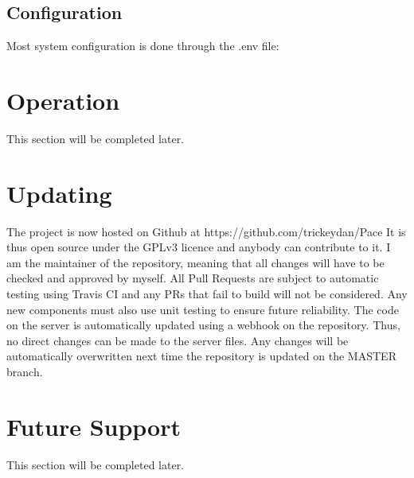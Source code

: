 \documentclass{article}
\begin{document}
\subsection{Configuration}

Most system configuration is done through the .env file:




\section{Operation}
This section will be completed later.

\section{Updating}
The project is now hosted on Github at https://github.com/trickeydan/Pace
It is thus open source under the GPLv3 licence and anybody can contribute to it. I am the maintainer of the repository, meaning that all changes will have to be checked and approved by myself. All Pull Requests are subject to automatic testing using Travis CI and any PRs that fail to build will not be considered. Any new components must also use unit testing to ensure future reliability.
The code on the server is automatically updated using a webhook on the repository. Thus, no direct changes can be made to the server files. Any changes will be automatically overwritten next time the repository is updated on the MASTER branch.

\section{Future Support}
This section will be completed later.
\end{document}
